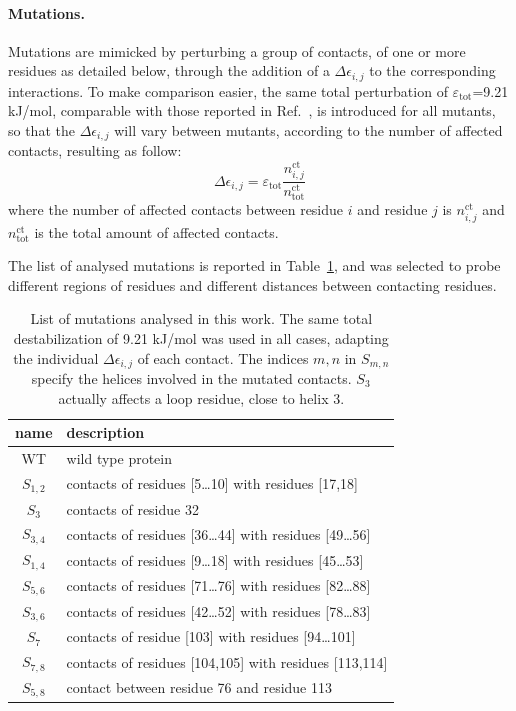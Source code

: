 \paragraph{Mutations.}
Mutations are mimicked by perturbing a group of contacts, of one or more
residues as detailed below, through the addition of a $\Delta \epsilon_{i,j}$
to the corresponding interactions.
To make comparison easier, the same total
perturbation of $\varepsilon_\text{tot}$=9.21 kJ/mol, comparable with those reported
in Ref.~\cite{Lowe2007a},  is introduced for all mutants, so that the $\Delta
\epsilon_{i,j}$ will vary between  mutants, according to the number of affected
contacts, resulting as follow:
\begin{equation}
\Delta\epsilon_{i,j}=\varepsilon_\text{tot}\frac{n^\text{ct}_{i,j}}{n^\text{ct}_\text{tot}}
\end{equation}
where the number of affected contacts between residue $i$ and residue $j$ is 
$n^\text{ct}_{i,j}$ and $n^\text{ct}_\text{tot}$ is the total amount of affected
contacts.

The list of analysed mutations is reported in Table~\ref{table:mutations}, and
was selected to probe different regions of residues and different distances
between contacting residues.
\begin{table}
\centering
\begin{tabular}{ c | l }
\hline \hline 
name & description \\
\hline
WT		& wild type protein\\
$S_{1,2}$	& contacts of residues [5\dots10] with residues [17,18]\\
$S_{3}$		& contacts of residue 32\\
$S_{3,4}$	& contacts of residues [36\dots44] with residues [49\dots56]\\
$S_{1,4}$	& contacts of residues [9\dots18] with residues [45\dots53]\\
$S_{5,6}$	& contacts of residues [71\dots76] with residues [82\dots88]\\
$S_{3,6}$	& contacts of residues [42\dots52] with residues [78\dots83]\\
$S_{7}$		& contacts of residue [103] with residues [94\dots101]\\
$S_{7,8}$	& contacts of residues [104,105] with residues [113,114]\\
$S_{5,8}$	& contact  between residue 76 and residue 113\\
\hline \hline
\end{tabular}
\caption{\label{table:mutations}  List of mutations analysed in this work. The
same total destabilization of 9.21 kJ/mol was used in all cases, adapting the
individual $\Delta \epsilon_{i,j}$ of each contact. The indices $m,n$ in
$S_{m,n}$ specify the helices involved in the mutated contacts. $S_3$ actually
affects a loop residue, close to helix 3.}
\end{table}


